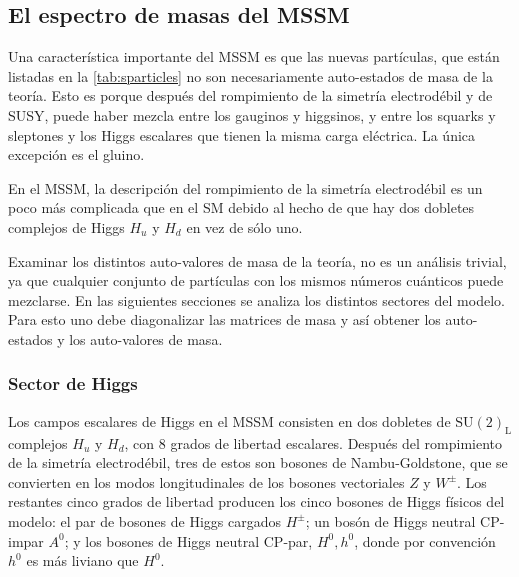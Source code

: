 \subsection{El espectro de masas del MSSM}

Una característica importante del MSSM es que las nuevas partículas, que están
listadas en la \cref{tab:sparticles} no son necesariamente auto-estados de masa
de la teoría. Esto es porque después del rompimiento de la simetría
electrodébil y de SUSY, puede haber mezcla entre los gauginos y higgsinos, y
entre los squarks y sleptones y los Higgs escalares que tienen la misma carga
eléctrica. La única excepción es el gluino.

En el MSSM, la descripción del rompimiento de la simetría electrodébil es un
poco más complicada que en el SM debido al hecho de que hay dos dobletes
complejos de Higgs $H_u$ y $H_d$ en vez de sólo uno.





Examinar los distintos auto-valores de masa de la teoría, no es un análisis
trivial, ya que cualquier conjunto de partículas con los mismos números
cuánticos puede mezclarse. En las siguientes secciones se analiza los distintos
sectores del modelo. Para esto uno debe diagonalizar las matrices de masa y así
obtener los auto-estados y los auto-valores de masa.


\subsubsection{Sector de Higgs}

Los campos escalares de Higgs en el MSSM consisten en dos dobletes de
$\text{SU}(2)_\text{L}$ complejos $H_u$ y $H_d$, con 8 grados de libertad
escalares. Después del rompimiento de la simetría electrodébil, tres de estos
son bosones de Nambu-Goldstone, que se convierten en los modos longitudinales de
los bosones vectoriales $Z$ y $W^\pm$. Los restantes cinco grados de libertad
producen los cinco bosones de Higgs físicos del modelo: el par de bosones de
Higgs cargados $H^\pm$; un bosón de Higgs neutral CP-impar $A^0$; y los bosones
de Higgs neutral CP-par, $H^0,h^0$, donde por convención $h^0$ es más liviano
que $H^0$.


